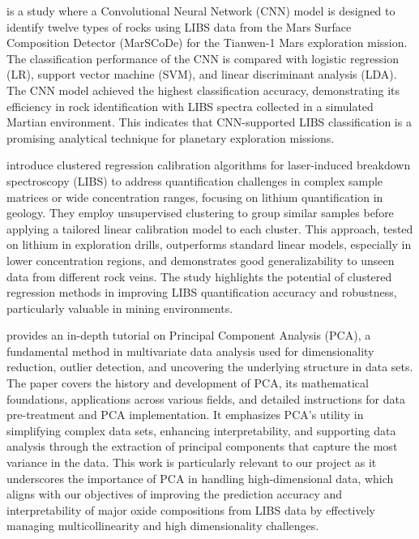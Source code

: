 \cite{yangConvolutionalNeuralNetwork2022} is a study where a Convolutional Neural Network (CNN) model is designed to identify twelve types of rocks using LIBS data from the Mars Surface Composition Detector (MarSCoDe) for the Tianwen-1 Mars exploration mission.
The classification performance of the CNN is compared with logistic regression (LR), support vector machine (SVM), and linear discriminant analysis (LDA).
The CNN model achieved the highest classification accuracy, demonstrating its efficiency in rock identification with LIBS spectra collected in a simulated Martian environment.
This indicates that CNN-supported LIBS classification is a promising analytical technique for planetary exploration missions.

\citet{silvaRobustCalibrationModels2022} introduce clustered regression calibration algorithms for laser-induced breakdown spectroscopy (LIBS) to address quantification challenges in complex sample matrices or wide concentration ranges, focusing on lithium quantification in geology.
They employ unsupervised clustering to group similar samples before applying a tailored linear calibration model to each cluster.
This approach, tested on lithium in exploration drills, outperforms standard linear models, especially in lower concentration regions, and demonstrates good generalizability to unseen data from different rock veins.
The study highlights the potential of clustered regression methods in improving LIBS quantification accuracy and robustness, particularly valuable in mining environments.

\citet{woldPrincipalComponentAnalysis1987} provides an in-depth tutorial on Principal Component Analysis (PCA), a fundamental method in multivariate data analysis used for dimensionality reduction, outlier detection, and uncovering the underlying structure in data sets.
The paper covers the history and development of PCA, its mathematical foundations, applications across various fields, and detailed instructions for data pre-treatment and PCA implementation.
It emphasizes PCA's utility in simplifying complex data sets, enhancing interpretability, and supporting data analysis through the extraction of principal components that capture the most variance in the data.
This work is particularly relevant to our project as it underscores the importance of PCA in handling high-dimensional data, which aligns with our objectives of improving the prediction accuracy and interpretability of major oxide compositions from LIBS data by effectively managing multicollinearity and high dimensionality challenges.

